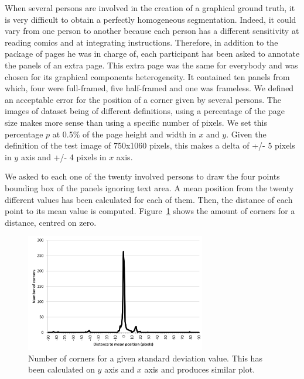When several persons are involved in the creation of a graphical ground truth, it is very difficult to obtain a perfectly homogeneous segmentation.
Indeed, it could vary from one person to another because each person has a different sensitivity at reading comics and at integrating instructions.
Therefore, in addition to the package of pages he was in charge of, each participant has been asked to annotate the panels of an extra page. 
This extra page was the same for everybody and was chosen for its graphical components heterogeneity. 
It contained ten panels from which, four were full-framed, five half-framed and one was frameless.
We defined an acceptable error for the position of a corner given by several persons.
The images of dataset being of different definitions, using a percentage of the page size makes more sense than using a specific number of pixels.
We set this percentage $p$ at 0.5\% of the page height and width in $x$ and $y$. 
Given the definition of the test image of 750x1060 pixels, this makes a delta of +/- 5 pixels in $y$ axis and +/- 4 pixels in $x$ axis. 

We asked to each one of the twenty involved persons to draw the four points bounding box of the panels ignoring text area.
A mean position from the twenty different values has been calculated for each of them.
Then, the distance of each point to its mean value is computed. 
Figure~\ref{fig:gt:graphiqueStdVT} shows the amount of corners for a distance, centred on zero.


\begin{figure}[h!]
\begin{center}
\includegraphics[width=0.7\textwidth]{stdVT.png}
\caption[Distance to the mean position]{Number of corners for a given standard deviation value. This has been calculated on $y$ axis and $x$ axis and produces similar plot.}
\label{fig:gt:graphiqueStdVT}
\end{center}
\end{figure}

